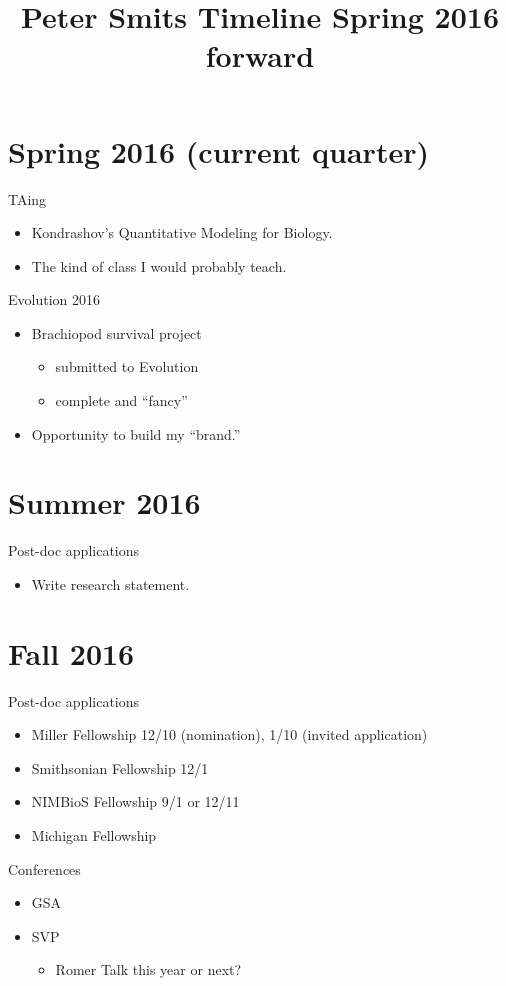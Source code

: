 \documentclass{article}
\title{Peter Smits Timeline Spring 2016 forward}
\date{}
\begin{document}
\linenumbers
\modulolinenumbers[2]

\maketitle

\section{Spring 2016 (current quarter)}
TAing 
\begin{itemize}
  \item Kondrashov's Quantitative Modeling for Biology.
  \item The kind of class I would probably teach.
\end{itemize}

Evolution 2016
\begin{itemize}
  \item Brachiopod survival project
    \begin{itemize}
      \item submitted to Evolution
      \item complete and ``fancy''
    \end{itemize}
  \item Opportunity to build my ``brand.''
\end{itemize}


\section{Summer 2016}
Post-doc applications
\begin{itemize}
  \item Write research statement.
\end{itemize}


\section{Fall 2016}
Post-doc applications
\begin{itemize}
  \item Miller Fellowship 12/10 (nomination), 1/10 (invited application)
  \item Smithsonian Fellowship 12/1
  \item NIMBioS Fellowship 9/1 or 12/11
  \item Michigan Fellowship
\end{itemize}

Conferences
\begin{itemize}
  \item GSA
  \item SVP
    \begin{itemize}
      \item Romer Talk this year or next?
    \end{itemize}
\end{itemize}
\end{document}
